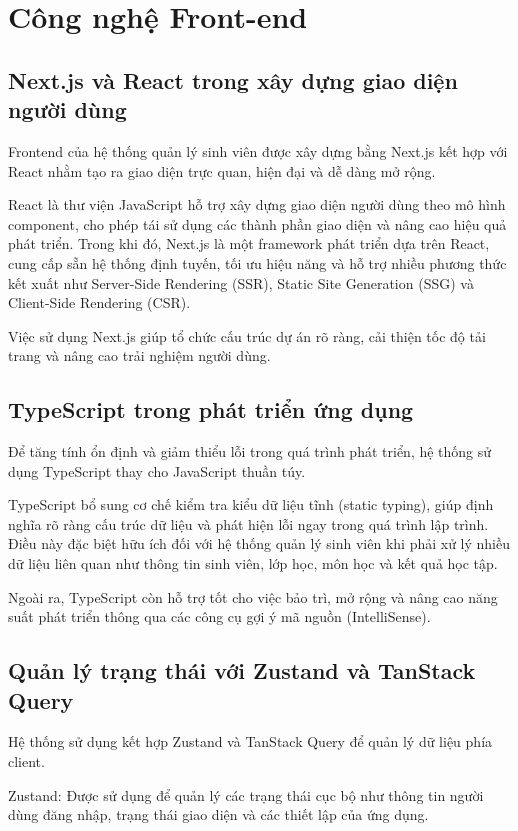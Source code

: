 \documentclass[../DoAn.tex]{subfiles}
\begin{document}
\section{Công nghệ Front-end}
\label{section:3.1}
\subsection{Next.js và React trong xây dựng giao diện người dùng}
\label{subsection:3.1.1}

Frontend của hệ thống quản lý sinh viên được xây dựng bằng Next.js kết hợp với React \cite{react} nhằm tạo ra giao diện trực quan, hiện đại và dễ dàng mở rộng.

React là thư viện JavaScript hỗ trợ xây dựng giao diện người dùng theo mô hình component, cho phép tái sử dụng các thành phần giao diện và nâng cao hiệu quả phát triển. Trong khi đó, Next.js là một framework phát triển dựa trên React, cung cấp sẵn hệ thống định tuyến, tối ưu hiệu năng và hỗ trợ nhiều phương thức kết xuất như Server-Side Rendering (SSR), Static Site Generation (SSG) và Client-Side Rendering (CSR).

Việc sử dụng Next.js giúp tổ chức cấu trúc dự án rõ ràng, cải thiện tốc độ tải trang và nâng cao trải nghiệm người dùng.
\subsection{TypeScript trong phát triển ứng dụng}
\label{subsection:3.1.2}
Để tăng tính ổn định và giảm thiểu lỗi trong quá trình phát triển, hệ thống sử dụng TypeScript thay cho JavaScript thuần túy.

TypeScript bổ sung cơ chế kiểm tra kiểu dữ liệu tĩnh (static typing), giúp định nghĩa rõ ràng cấu trúc dữ liệu và phát hiện lỗi ngay trong quá trình lập trình. Điều này đặc biệt hữu ích đối với hệ thống quản lý sinh viên khi phải xử lý nhiều dữ liệu liên quan như thông tin sinh viên, lớp học, môn học và kết quả học tập.

Ngoài ra, TypeScript còn hỗ trợ tốt cho việc bảo trì, mở rộng và nâng cao năng suất phát triển thông qua các công cụ gợi ý mã nguồn (IntelliSense).
\subsection{Quản lý trạng thái với Zustand và TanStack Query}
\label{subsection:3.1.3}
Hệ thống sử dụng kết hợp Zustand và TanStack Query để quản lý dữ liệu phía client.

Zustand: Được sử dụng để quản lý các trạng thái cục bộ như thông tin người dùng đăng nhập, trạng thái giao diện và các thiết lập của ứng dụng.
\end{document}
